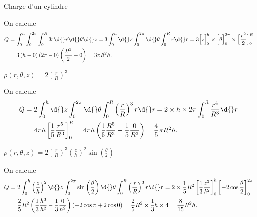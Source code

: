 \begin{exo}[PC][1][appli]{Charge d'un cylindre}
  \begin{corrige}
  On calcule
  \begin{align*}
  	Q &= \int_{0}^{h} \int_{0}^{2\pi} \int_{0}^{R} 3 r
  	\d{}r \d{} \theta \d{} z
  	= 3 \int_{0}^{h} \d{} z \int_{0}^{2\pi} \d{} \theta \int_{0}^{R} r \d{}r
  	= 3 \Big[ z \Big]^{h}_{0}\times \Big[ \theta \Big]^{2\pi}_{0} \times \Big[ \frac{r^2}{2} \Big]^{R}_{0}\\
  	&= 3 \left( h -0 \right) \left( 2\pi - 0 \right) \left( \frac{R^2}{2} - 0 \right)
  	= 3\pi R^2h.
  \end{align*}
  \end{corrige}

  \begin{enonce}
  	$\rho\left(r,\theta,z\right) = 2\left(\frac{r}{R}\right)^3$
  \end{enonce}

  \begin{corrige}
  On calcule
  	\begin{align*}
  		Q &= 2\int_{0}^{h} \d{} z \int_{0}^{2\pi} \d{} \theta  \int_{0}^{R} \left( \frac{r}{R} \right)^3 r \d{}r
  		= 2 \times h \times 2\pi \int^{R}_{0} \frac{r^4}{R^3} \d{}r \\
  		&= 4\pi h \left[ \frac{1}{5} \frac{r^5}{R^3} \right]^{R}_{0}
  		= 4\pi h \left( \frac{1}{5} \frac{R^5}{R^3} - \frac{1}{5} \frac{0}{R^3} \right)
  		= \frac{4}{5}\pi R^2h.
  	\end{align*}
  \end{corrige}

  \begin{enonce}
  	$\rho\left(r,\theta,z\right) = 2\left(\frac{r}{R}\right)^3\left(\frac{z}{h}\right)^2\sin\left(\frac{\theta}{2}\right)$
  \end{enonce}

  \begin{corrige}
  On calcule
  	\begin{align*}
  		Q &= 2\int_{0}^{h} \left( \frac{z}{h} \right)^{2} \d{} z \int_{0}^{2\pi} \sin \left( \frac{\theta}{2} \right) \d{} \theta  \int_{0}^{R} \left( \frac{r}{R} \right)^3 r \d{}r
  		= 2 \times \frac{1}{5}R^2 \left[ \frac{1}{3}\frac{z^3}{h^2} \right]^{h}_{0} \left[ -2 \cos \frac{\theta}{2} \right]^{2\pi}_{0}\\
  		&= \frac{2}{5}R^2 \left( \frac{1}{3}\frac{h^3}{h^2} - \frac{1}{3}\frac{0}{h^2} \right) \left( -2\cos \pi + 2 \cos 0 \right)
  		= \frac{2}{5}R^2 \times \frac{1}{3} h \times 4 = \frac{8}{15}R^2h.
  	\end{align*}
  \end{corrige}
\end{exo}

